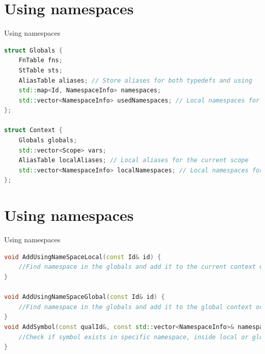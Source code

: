 \documentclass{beamer}
\begin{document}
\section{Using namespaces}
\begin{frame}[fragile]{Using namespaces}
\begin{lstlisting}[language=C++]
struct Globals {
    FnTable fns;
    StTable sts;
    AliasTable aliases; // Store aliases for both typedefs and using
    std::map<Id, NamespaceInfo> namespaces;
    std::vector<NamespaceInfo> usedNamespaces; // Local namespaces for the current scope
};

struct Context {
    Globals globals;
    std::vector<Scope> vars;
    AliasTable localAliases; // Local aliases for the current scope
    std::vector<NamespaceInfo> localNamespaces; // Local namespaces for the current scope
};
\end{lstlisting}
\end{frame}
\section{Using namespaces}
\begin{frame}[fragile,shrink=4]{Using namespaces}
\begin{lstlisting}[language=C++]
void AddUsingNameSpaceLocal(const Id& id) {
    //Find namespace in the globals and add it to the current context or if symbols from that namespace were included, update the values
}

void AddUsingNameSpaceGlobal(const Id& id) {
    //Find namespace in the globals and add it to the global context or if symbols from that namespace were included, update the values
}
void AddSymbol(const qualId&, const std::vector<NamespaceInfo>& namespaces) {
    //Check if symbol exists in specific namespace, inside local or global used namespace list, create a dummy namespace with nested dummy namespaces but without any values and add the symbol to that namespace
}
\end{lstlisting}
\end{frame}
\end{document}
